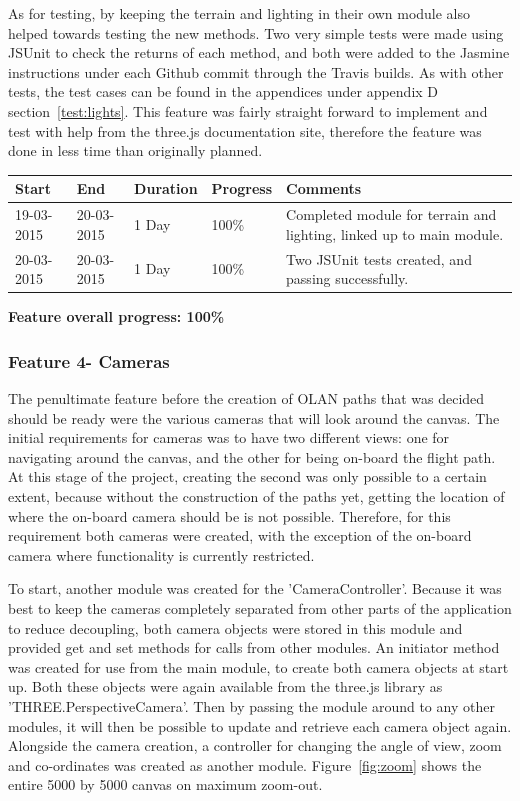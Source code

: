 As for testing, by keeping the terrain and lighting in their own module also helped towards testing the new methods. Two very simple tests were made using JSUnit to check the returns of each method, and both were added to the Jasmine instructions under each Github commit through the Travis builds. As with other tests, the test cases can be found in the appendices under appendix D section~\ref{test:lights}. This feature was fairly straight forward to implement and test with help from the three.js documentation site, therefore the feature was done in less time than originally planned.

\begin{table}[h]
\begin{tabular}{|l|l|l|l|p{7cm}|}
\hline
\textbf{Start} & \textbf{End} & \textbf{Duration} & \textbf{Progress} & \textbf{Comments}                                                                                                     \\ \hline
19-03-2015     & 20-03-2015   & 1 Day            & 100\%             &  Completed module for terrain and lighting, linked up to main module.\\ \hline
20-03-2015     & 20-03-2015   & 1 Day            & 100\%             &  Two JSUnit tests created, and passing successfully.\\ \hline
\end{tabular}
\end{table}

\textbf{Feature overall progress: 100\%}

\subsubsection{Feature 4- Cameras}
The penultimate feature before the creation of OLAN paths that was decided should be ready were the various cameras that will look around the canvas. The initial requirements for cameras was to have two different views: one for navigating around the canvas, and the other for being on-board the flight path. At this stage of the project, creating the second was only possible to a certain extent, because without the construction of the paths yet, getting the location of where the on-board camera should be is not possible. Therefore, for this requirement both cameras were created, with the exception of the on-board camera where functionality is currently restricted. 

To start, another module was created for the 'CameraController'. Because it was best to keep the cameras completely separated from other parts of the application to reduce decoupling, both camera objects were stored in this module and provided get and set methods for calls from other modules. An initiator method was created for use from the main module, to create both camera objects at start up. Both these objects were again available from the three.js library as 'THREE.PerspectiveCamera'. Then by passing the module around to any other modules, it will then be possible to update and retrieve each camera object again. Alongside the camera creation, a controller for changing the angle of view, zoom and co-ordinates was created as another module. Figure~\ref{fig:zoom} shows the entire 5000 by 5000 canvas on maximum zoom-out.

